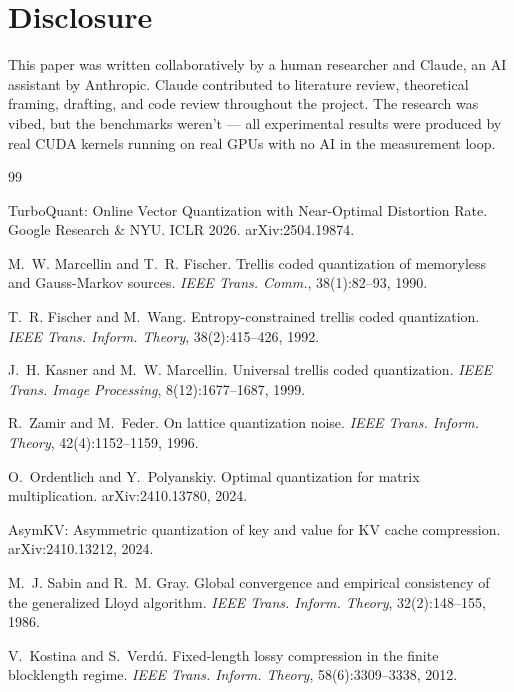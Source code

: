 \documentclass{article}
\begin{document}
\section*{Disclosure}

This paper was written collaboratively by a human researcher and Claude, an AI
assistant by Anthropic. Claude contributed to literature review, theoretical
framing, drafting, and code review throughout the project. The research was
vibed, but the benchmarks weren't --- all experimental results were produced by
real CUDA kernels running on real GPUs with no AI in the measurement loop.

\begin{thebibliography}{99}

TurboQuant: Online Vector Quantization with Near-Optimal Distortion Rate.
Google Research \& NYU. ICLR 2026. arXiv:2504.19874.

M.~W. Marcellin and T.~R. Fischer.
Trellis coded quantization of memoryless and Gauss-Markov sources.
\textit{IEEE Trans. Comm.}, 38(1):82--93, 1990.

T.~R. Fischer and M.~Wang.
Entropy-constrained trellis coded quantization.
\textit{IEEE Trans. Inform. Theory}, 38(2):415--426, 1992.

J.~H. Kasner and M.~W. Marcellin.
Universal trellis coded quantization.
\textit{IEEE Trans. Image Processing}, 8(12):1677--1687, 1999.

R.~Zamir and M.~Feder.
On lattice quantization noise.
\textit{IEEE Trans. Inform. Theory}, 42(4):1152--1159, 1996.

O.~Ordentlich and Y.~Polyanskiy.
Optimal quantization for matrix multiplication.
arXiv:2410.13780, 2024.

AsymKV: Asymmetric quantization of key and value for KV cache compression.
arXiv:2410.13212, 2024.

M.~J. Sabin and R.~M. Gray.
Global convergence and empirical consistency of the generalized Lloyd algorithm.
\textit{IEEE Trans. Inform. Theory}, 32(2):148--155, 1986.

V.~Kostina and S.~Verd\'{u}.
Fixed-length lossy compression in the finite blocklength regime.
\textit{IEEE Trans. Inform. Theory}, 58(6):3309--3338, 2012.


\end{thebibliography}
\end{document}
